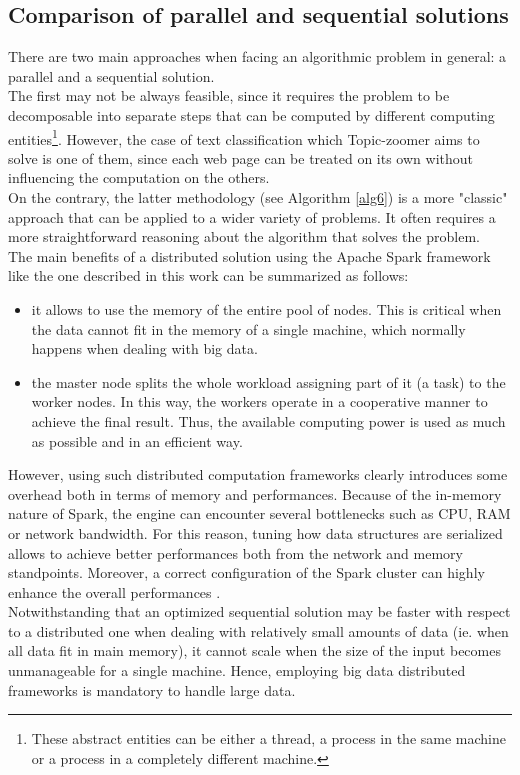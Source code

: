 \documentclass{sig-alternate-05-2015}
\begin{document}
\subsection{Comparison of parallel and sequential solutions}
There are two main approaches when facing an algorithmic problem in general: a parallel and a sequential solution.\\
The first may not be always feasible, since it requires the problem to be decomposable into separate steps that can be computed by different computing entities\footnote{These abstract entities can be either a thread, a process in the same machine or a process in a completely different machine.}. However, the case of text classification which Topic-zoomer aims to solve is one of them, since each web page can be treated on its own without influencing the computation on the others.\\
On the contrary, the latter methodology (see Algorithm \ref{alg6}) is a more "classic" approach that can be applied to a wider variety of problems. It often requires a more straightforward reasoning about the algorithm that solves the problem.\\
The main benefits of a distributed solution using the Apache Spark framework like the one described in this work can be summarized as follows:
\begin{itemize}
    \item it allows to use the memory of the entire pool of nodes. This is critical when the data cannot fit in the memory of a single machine, which normally happens when dealing with big data.
    \item the master node splits the whole workload assigning part of it (a task) to the worker nodes. In this way, the workers operate in a cooperative manner to achieve the final result. Thus, the available computing power is used as much as possible and in an efficient way.
\end{itemize}
However, using such distributed computation frameworks clearly introduces some overhead both in terms of memory and performances. Because of the in-memory nature of Spark, the engine can encounter several bottlenecks such as CPU, RAM or network bandwidth. For this reason, tuning how data structures are serialized allows to achieve better performances both from the network and memory standpoints. Moreover, a correct configuration of the Spark cluster can highly enhance the overall performances \cite{li2015sparkbench}.\\
Notwithstanding that an optimized sequential solution may be faster with respect to a distributed one when dealing with relatively small amounts of data (ie. when all data fit in main memory), it cannot scale when the size of the input becomes unmanageable for a single machine. Hence, employing big data distributed frameworks is mandatory to handle large data.
\end{document}

